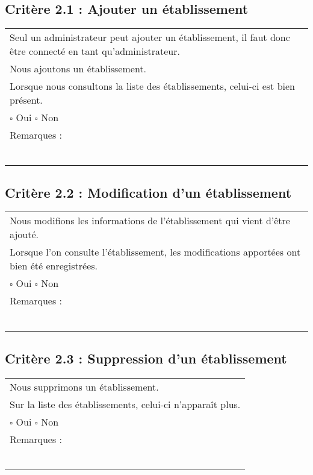   	\subsection*{Critère 2.1 : Ajouter un établissement}
  		\begin{center}
    	 		\begin{tabular}[h]{|p{}|}
			\hline
				Seul un administrateur peut ajouter un établissement, il faut donc être connecté en tant qu'administrateur.\\
				Nous ajoutons un établissement. \\
				Lorsque nous consultons la liste des établissements, celui-ci est bien présent. \\
						
				
				$\square$ Oui  \hfill \hfill $\square$ Non \\\hline Remarques : \\ ~\\
			 \\\hline
     		\end{tabular}
  		\end{center}	
  		
  	\subsection*{Critère 2.2 : Modification d'un établissement}
  		\begin{center}
    	 		\begin{tabular}[h]{|p{}|}
			\hline
				Nous modifions les informations de l'établissement qui vient d'être ajouté.\\
				Lorsque l'on consulte l'établissement, les modifications apportées ont bien été enregistrées. \\			
				
				$\square$ Oui  \hfill \hfill $\square$ Non \\\hline Remarques : \\ ~\\
			 \\\hline
     		\end{tabular}
  		\end{center}	
  		
  	\subsection*{Critère 2.3 : Suppression d'un établissement}
  		\begin{center}
    	 		\begin{tabular}[h]{|p{}|}
			\hline
				Nous supprimons un établissement. \\
				Sur la liste des établissements, celui-ci n'apparaît plus. \\
				
				$\square$ Oui  \hfill \hfill $\square$ Non \\\hline Remarques : \\ ~\\
			 \\\hline
     		\end{tabular}
  		\end{center}	
  		
